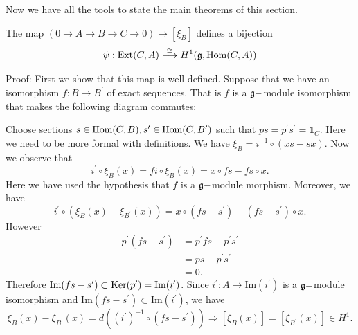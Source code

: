 Now we have all the tools to state the main theorems of this section. 
\begin{dang}
    \begin{theorem}
        The map $(0\to A\to B\to C\to 0)\mapsto [\xi_B]$ defines a bijection
        \begin{equation}
           \psi: \text{Ext}(C,A)\overset{\cong}{\longrightarrow} H^1(\mathfrak{g},\text{Hom}(C,A))
        \end{equation}
    \end{theorem}
\end{dang}
Proof: First we show that this map is well defined. Suppose that we have an isomorphism $f:B\to B^\prime$ of 
exact sequences. That is $f$ is a $\mathfrak{g}-$module isomorphism that makes the following diagram commutes:
\begin{center}
\end{center}
Choose sections $s\in\text{Hom}(C,B),s^\prime\in\text{Hom}(C,B^\prime)$ such that $ps=p^\prime s^\prime=\mathds{1}_C$. Here we need to be more 
formal with definitions. We have $\xi_B=i^{-1}\circ(xs-sx)$. Now we observe that 
\begin{equation}
   i^\prime\circ\xi_B(x)= fi\circ\xi_B(x)=x\circ fs-fs\circ x.
\end{equation}
Here we have used the hypothesis that $f$ is a $\mathfrak{g}-$module morphism. Moreover, we have
\begin{equation}
    i^\prime\circ(\xi_B(x)-\xi_{B^\prime}(x))=x\circ(fs-s^\prime)-(fs-s^\prime)\circ x.
\end{equation}
However
\begin{equation}
    \begin{split}
        p^\prime(fs-s^\prime)&=p^\prime fs-p^\prime s^\prime\\
        &=ps-p^\prime s^\prime \\
        &=0.
    \end{split}
\end{equation}
Therefore $\text{Im}(fs-s^\prime)\subset\text{Ker}(p^\prime)=\text{Im}(i^\prime)$. Since $i^\prime:A\to \text{Im}(i^\prime)$ is a 
$\mathfrak{g}-$module isomorphism and $\text{Im}(fs-s^\prime)\subset\text{Im}(i^\prime)$, we have 
\begin{equation}
    \xi_B(x)-\xi_{B^\prime}(x)=d((i^\prime)^{-1}\circ(fs-s^\prime))\Rightarrow [\xi_B(x)]=[\xi_{B^\prime}(x)]\in H^1.
\end{equation}

